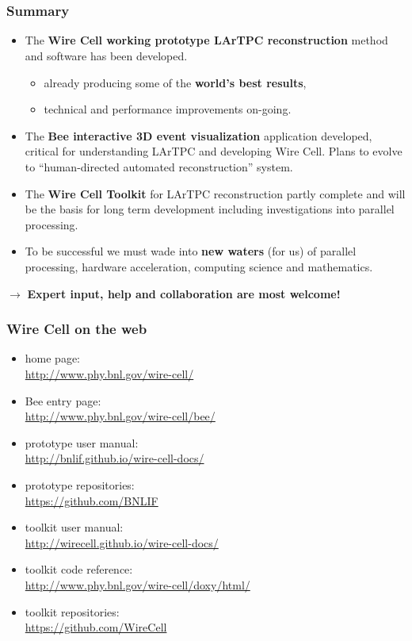 

\section{}

\begin{frame}
  \frametitle{Summary}
  \footnotesize
  \begin{itemize}
  \item The \textbf{Wire Cell working prototype LArTPC reconstruction} method and software has been developed.
    \begin{itemize}  \footnotesize
    \item already producing some of the \textbf{world's best results},
    \item technical and performance improvements on-going.
    \end{itemize}
  \item The \textbf{Bee interactive 3D event visualization}
    application developed, critical for understanding LArTPC and
    developing Wire Cell.  Plans to evolve to ``human-directed
    automated reconstruction'' system.
  \item The \textbf{Wire Cell Toolkit} for LArTPC reconstruction
    partly complete and will be the basis for long term development
    including investigations into parallel processing.
  \item To be successful we must wade into \textbf{new waters} (for
    us) of parallel processing, hardware acceleration, computing
    science and mathematics.
  \end{itemize}

  \begin{center}
    $\rightarrow$ \textbf{Expert input, help and collaboration are
      most welcome!}
  \end{center}
\end{frame}

\begin{frame}
  \frametitle{Wire Cell on the web}

  \begin{itemize}
  \item home page: \\ \url{http://www.phy.bnl.gov/wire-cell/}
  \item Bee entry page: \\ \url{http://www.phy.bnl.gov/wire-cell/bee/}
  \item prototype user manual: \\ \url{http://bnlif.github.io/wire-cell-docs/}
  \item prototype repositories: \\ \url{https://github.com/BNLIF}
  \item toolkit user manual: \\ \url{http://wirecell.github.io/wire-cell-docs/}
  \item toolkit code reference: \\ \url{http://www.phy.bnl.gov/wire-cell/doxy/html/}
  \item toolkit repositories: \\ \url{https://github.com/WireCell}
  \end{itemize}
\end{frame}
